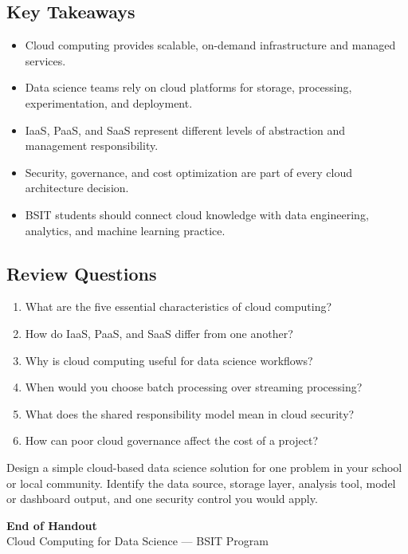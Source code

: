 \documentclass[11pt,a4paper]{article}
\begin{document}
\subsection{Key Takeaways}

\begin{itemize}[leftmargin=*]
  \item Cloud computing provides scalable, on-demand infrastructure and managed services.
  \item Data science teams rely on cloud platforms for storage, processing, experimentation, and deployment.
  \item IaaS, PaaS, and SaaS represent different levels of abstraction and management responsibility.
  \item Security, governance, and cost optimization are part of every cloud architecture decision.
  \item BSIT students should connect cloud knowledge with data engineering, analytics, and machine learning practice.
\end{itemize}

\subsection{Review Questions}

\begin{enumerate}[leftmargin=*]
  \item What are the five essential characteristics of cloud computing?
  \item How do IaaS, PaaS, and SaaS differ from one another?
  \item Why is cloud computing useful for data science workflows?
  \item When would you choose batch processing over streaming processing?
  \item What does the shared responsibility model mean in cloud security?
  \item How can poor cloud governance affect the cost of a project?
\end{enumerate}

\begin{examplebox}
Design a simple cloud-based data science solution for one problem in your school or local community. Identify the data source, storage layer, analysis tool, model or dashboard output, and one security control you would apply.
\end{examplebox}

\vfill
\begin{center}
{\large\textcolor{primary}{\textbf{End of Handout}}}\\[4pt]
{\small\textcolor{gray!70!black}{Cloud Computing for Data Science --- BSIT Program}}
\end{center}
\end{document}
